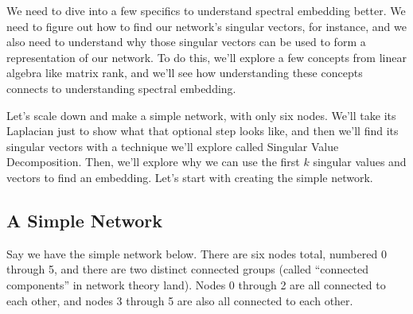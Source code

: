 \documentclass[letterpaper,10pt,english]{jupyterBook}
\begin{document}
\sphinxAtStartPar
We need to dive into a few specifics to understand spectral embedding better. We need to figure out how to find our network’s singular vectors, for instance, and we also need to understand why those singular vectors can be used to form a representation of our network. To do this, we’ll explore a few concepts from linear algebra like matrix rank, and we’ll see how understanding these concepts connects to understanding spectral embedding.

\sphinxAtStartPar
Let’s scale down and make a simple network, with only six nodes. We’ll take its Laplacian just to show what that optional step looks like, and then we’ll find its singular vectors with a technique we’ll explore called Singular Value Decomposition. Then, we’ll explore why we can use the first \(k\) singular values and vectors to find an embedding. Let’s start with creating the simple network.


\subsection{A Simple Network}
\label{\detokenize{representations/ch6/spectral-embedding:a-simple-network}}
\sphinxAtStartPar
Say we have the simple network below. There are six nodes total, numbered 0 through 5, and there are two distinct connected groups (called “connected components” in network theory land). Nodes 0 through 2 are all connected to each other, and nodes 3 through 5 are also all connected to each other.

\begin{sphinxVerbatim}[commandchars=\\\{\}]
   
   

   
       
    \PYG{p}{[} \PYG{p}{]}  
    \PYG{p}{[} \PYG{p}{]}  
     

   

   \PYG{p}{[}  \PYG{p}{]} 
     
    
   \PYG{p}{[}  \PYG{p}{]} 
     
\end{sphinxVerbatim}
\end{document}

